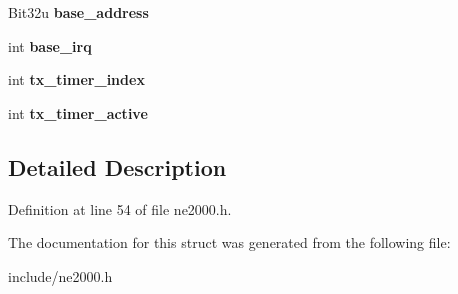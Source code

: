\begin{DoxyCompactItemize}
\item 
\hypertarget{structbx__ne2k__t_a719b2634928ebaff42e46b3e4034b373}{Bit32u {\bfseries base\-\_\-address}}\label{structbx__ne2k__t_a719b2634928ebaff42e46b3e4034b373}

\item 
\hypertarget{structbx__ne2k__t_a508544f77999904326d460e986f9ba7a}{int {\bfseries base\-\_\-irq}}\label{structbx__ne2k__t_a508544f77999904326d460e986f9ba7a}

\item 
\hypertarget{structbx__ne2k__t_a19f9672f0a9e220d0b62b1131dba7d91}{int {\bfseries tx\-\_\-timer\-\_\-index}}\label{structbx__ne2k__t_a19f9672f0a9e220d0b62b1131dba7d91}

\item 
\hypertarget{structbx__ne2k__t_adf0099d6d61dbc0fa33b6d091680cc4e}{int {\bfseries tx\-\_\-timer\-\_\-active}}\label{structbx__ne2k__t_adf0099d6d61dbc0fa33b6d091680cc4e}

\end{DoxyCompactItemize}


\subsection{Detailed Description}


Definition at line 54 of file ne2000.\-h.



The documentation for this struct was generated from the following file\-:\begin{DoxyCompactItemize}
\item 
include/ne2000.\-h\end{DoxyCompactItemize}
